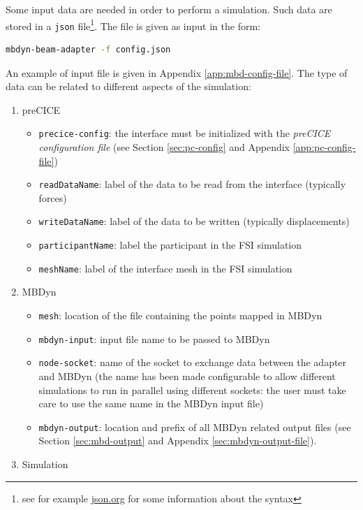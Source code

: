 Some input data are needed in order to perform a simulation. Such data are stored in a \texttt{json} file\footnote{see for example \href{https://www.json.org/json-en.html}{json.org} for some information about the syntax}. The file is given as input in the form:
\begin{lstlisting}[language=bash]
mbdyn-beam-adapter -f config.json
\end{lstlisting}

An example of input file is given in Appendix \ref{app:mbd-config-file}. The type of data can be related to different aspects of the simulation:

\begin{enumerate}
    \item preCICE
    \begin{itemize}
        \item \texttt{precice-config}: the interface must be initialized with the \textit{preCICE configuration file} (see Section \ref{sec:pc-config} and Appendix \ref{app:pc-config-file})
        \item \texttt{readDataName}: label of the data to be read from the interface (typically forces)
        \item \texttt{writeDataName}: label of the data to be written (typically displacements)
        \item \texttt{participantName}: label the participant in the FSI simulation
        \item \texttt{meshName}: label of the interface mesh in the FSI simulation
    \end{itemize}
    \item MBDyn
    \begin{itemize}
        \item \texttt{mesh}: location of the file containing the points mapped in MBDyn
        \item \texttt{mbdyn-input}: input file name to be passed to MBDyn
        \item \texttt{node-socket}: name of the socket to exchange data between the adapter and MBDyn (the name has been made configurable to allow different simulations to run in parallel using different sockets: the user must take care to use the same name in the MBDyn input file)
        \item \texttt{mbdyn-output}: location and prefix of all MBDyn related output files (see Section \ref{sec:mbd-output} and Appendix \ref{sec:mbdyn-output-file}).
    \end{itemize}
    \item Simulation

\end{enumerate}

